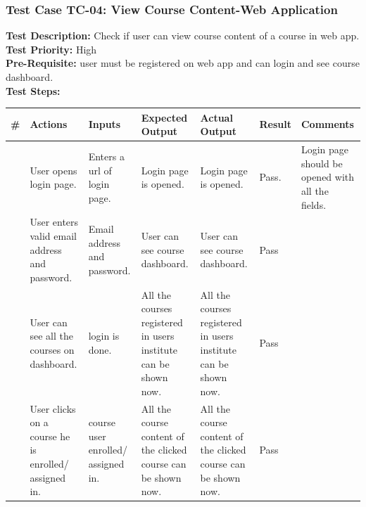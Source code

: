 \documentclass[12pt]{article}
\begin{document}
\subsubsection{Test Case TC-04: View Course Content-Web Application}
\textbf{Test Description: } Check if user can view course content of a course in web app. \\
\textbf{Test Priority: } High \\
\textbf{Pre-Requisite: } user must be registered on web app and can login and see course dashboard. \\
\textbf{Test Steps: }
\newpage
\begin{longtable}{ |>{\raggedright\arraybackslash} p{0.7cm} | >{\raggedright\arraybackslash}p{2cm}|>{\raggedright\arraybackslash} p{2cm} |>{\raggedright\arraybackslash} p{2.5cm} |>{\raggedright\arraybackslash} p{2.5cm} |>{\raggedright\arraybackslash} p{1.3cm} |>{\raggedright\arraybackslash} p{2.5cm} | } 
\hline
\textbf{\#}
& \textbf{Actions} 
& \textbf{Inputs}
& \textbf{Expected Output} 
& \textbf{Actual Output} 
& \textbf{Result} 
& \textbf{Comments} 
\\ 
\hline
1
& User opens login page. 
& Enters a url of login page.
& Login page is opened.
& Login page is opened.
& Pass.
& Login page should be opened with all the fields.
\\ 
\hline
2 
& User enters valid email address and password.
& Email address and password.
& User can see course dashboard.
& User can see course dashboard. 
& Pass
&  
\\ 
\hline
3
& User can see all the courses on dashboard.
& login is done.
& All the courses registered in users institute can be shown now.
& All the courses registered in users institute can be shown now. 
& Pass
&  
\\ 
\hline
4
& User clicks on a course he is enrolled/ assigned in.
& course user enrolled/ assigned in.
& All the course content of the clicked course can be shown now.
& All the course content of the clicked course can be shown now. 
& Pass
&  
\\ 
\hline

\end{longtable}
\end{document}
